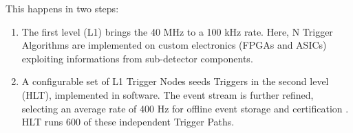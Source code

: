 This happens in two steps:

\begin{enumerate}

	\item The first level (L1) \cite{Bayatyan:706847} brings the 40 MHz to a 100 kHz rate. Here, N Trigger Algorithms are implemented on custom electronics (FPGAs and ASICs) exploiting informations from sub-detector components.

	\item A configurable set of L1 Trigger Nodes seeds Triggers in the second level (HLT), implemented in software. The event stream is further refined, selecting an average rate of 400 Hz for offline event storage and certification \cite{Khachatryan_2017}. HLT runs 600 of these independent Trigger Paths.

\end{enumerate}